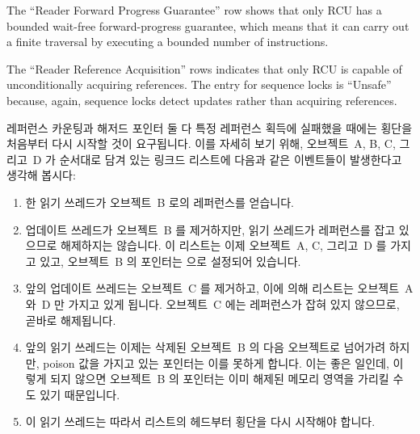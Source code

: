 The ``Reader Forward Progress Guarantee'' row shows that only RCU
has a bounded wait-free forward-progress guarantee, which means that
it can carry out a finite traversal by executing a bounded number of
instructions.

The ``Reader Reference Acquisition'' rows indicates that only RCU is
capable of unconditionally acquiring references.
The entry for sequence locks is ``Unsafe'' because, again, sequence locks
detect updates rather than acquiring references.
\fi

레퍼런스 카운팅과 해저드 포인터 둘 다 특정 레퍼런스 획득에 실패했을 때에는
횡단을 처음부터 다시 시작할 것이 요구됩니다.
이를 자세히 보기 위해, 오브젝트~A, B, C, 그리고~D 가 순서대로 담겨 있는 링크드
리스트에 다음과 같은 이벤트들이 발생한다고 생각해 봅시다:
\iffalse

Reference counting and hazard pointers both require that traversals be
restarted from the beginning if a given acquisition fails.
To see this, consider a linked list containing objects~A, B, C, and~D,
in that order, and the following series of events:
\fi

\begin{enumerate}
\item	한 읽기 쓰레드가 오브젝트~B 로의 레퍼런스를 얻습니다.
\item	업데이트 쓰레드가 오브젝트~B 를 제거하지만, 읽기 쓰레드가 레퍼런스를
	잡고 있으므로 해제하지는 않습니다.
	이 리스트는 이제 오브젝트~A, C, 그리고~D 를 가지고 있고, 오브젝트~B 의
	 포인터는  으로 설정되어 있습니다.
\item	앞의 업데이트 쓰레드는 오브젝트~C 를 제거하고, 이에 의해 리스트는
	오브젝트~A 와~D 만 가지고 있게 됩니다.
	오브젝트~C 에는 레퍼런스가 잡혀 있지 않으므로, 곧바로 해제됩니다.
\item	앞의 읽기 쓰레드는 이제는 삭제된 오브젝트~B 의 다음 오브젝트로 넘어가려
	하지만, poison 값을 가지고 있는  포인터는 이를 못하게
	합니다.
	이는 좋은 일인데, 이렇게 되지 않으면 오브젝트~B 의  포인터는
	이미 해제된 메모리 영역을 가리킬 수도 있기 때문입니다.
\item	이 읽기 쓰레드는 따라서 리스트의 헤드부터 횡단을 다시 시작해야 합니다.
\iffalse

\item	A reader acquires a reference to object~B.
\item	An updater removes~object B, but refrains from freeing it because
	the reader holds a reference.
	The list now contains objects~A, C, and~D, and
	object~B's \co{->next} pointer is set to \co{HAZPTR_POISON}.
\item	The updater removes object~C, so that the list now contains
	objects~A and~D.
	Because there is no reference to object~C, it is immediately freed.
\item	The reader tries to advance to the successor of the object
	following the now-removed object~B, but the poisoned
	\co{->next} pointer prevents this.
	Which is a good thing, because object~B's \co{->next} pointer
	would otherwise point to the freelist.
\item	The reader must therefore restart its traversal from the head
	of the list.
\fi
\end{enumerate}

